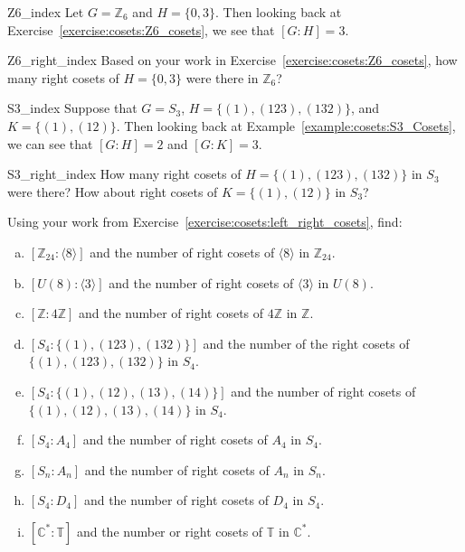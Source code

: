 \begin{example}{Z6_index}
Let $G= {\mathbb Z}_6$ and $H = \{ 0, 3 \}$. Then looking back at Exercise~\ref{exercise:cosets:Z6_cosets}, we see that $[G:H] = 3$.
\end{example}

\begin{exercise}{Z6_right_index}
Based on your work in  Exercise~\ref{exercise:cosets:Z6_cosets}, how many right cosets of  $H = \{ 0, 3 \}$ were there in ${\mathbb Z}_6$?
\end{exercise}

\begin{example}{S3_index}
Suppose that $G= S_3$, $H = \{ (1),(123), (132) \}$, and $K= \{ (1), (12) \}$.  Then looking back at Example~\ref{example:cosets:S3_Cosets}, we can see that $[G:H] = 2$ and $[G:K] = 3$. 
\end{example}

\begin{exercise}{S3_right_index}
How many right cosets of  $H = \{ (1),(123), (132) \}$ in $S_3$ were there?  How about right cosets of  $K= \{ (1), (12) \}$ in $S_3$?
\end{exercise}

\begin{exercise}{}
Using your work from Exercise~\ref{exercise:cosets:left_right_cosets}, find:

\begin{enumerate}[(a)]
\item
$[ {\mathbb Z}_{24}: \langle 8 \rangle ]$ and the number of right cosets of $\langle 8 \rangle$ in ${\mathbb Z}_{24}$.

\item
$[ U(8) : \langle 3 \rangle ]$ and the number of right cosets of $\langle 3 \rangle$ in $U(8)$.

\item
$[{\mathbb Z} : 4{\mathbb Z} ]$ and the number of right cosets of $4{\mathbb Z}$ in ${\mathbb Z}$.

\item
$[  S_4 : \{ (1), (123), (132) \}  ]$ and the number of the right cosets of $\{ (1), (123), (132) \}$ in $S_4$.

\item
$[ S_4 : \{ (1), (12), (13), (14) \} ]$ and the number of right cosets of $\{ (1), (12), (13), (14) \}$ in $S_4$.

\item
$[ S_4 : A_4 ]$ and the number of right cosets of $A_4$ in $S_4$.

\item
$[ S_n : A_n ]$ and the number of right cosets of $A_n$ in $S_n$.

\item
$[S_4 : D_4  ]$ and the number of right cosets of $D_4$ in $S_4$.

\item
$[ {\mathbb C}^\ast : {\mathbb T} ]$ and the number or right cosets of ${\mathbb T}$ in ${\mathbb C}^\ast$.

\end{enumerate}
\end{exercise}


